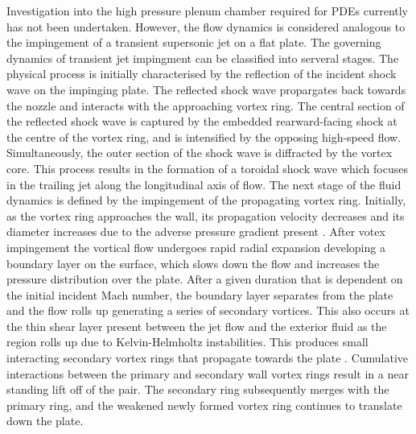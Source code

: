 Investigation into the high pressure plenum chamber required for PDEs currently has not been undertaken. However, the flow dynamics is considered analogous to the impingement of a transient supersonic jet on a flat plate. The governing dynamics of transient jet impingment can be classified into serveral stages. The physical process is initially characterised by the reflection of the incident shock wave on the impinging plate. The reflected shock wave propargates back towards the nozzle and interacts with the approaching vortex ring. The central section of the reflected shock wave is captured by the embedded rearward-facing shock at the centre of the vortex ring, and is intensified by the opposing high-speed flow. Simultaneously, the outer section of the shock wave is diffracted by the vortex core. This process results in the formation of a toroidal shock wave which focuses in the trailing jet along the longitudinal axis of flow. The next stage of the fluid dynamics is defined by the impingement of the propagating vortex ring. Initially, as the vortex ring approaches the wall, its propagation velocity decreases and its diameter increases due to the adverse pressure gradient present \cite{szumowski2000starting}. After votex impingement the vortical flow undergoes rapid radial expansion developing a boundary layer on the surface, which slows down the flow and increases the pressure distribution over the plate. After a given duration that is dependent on the initial incident Mach number, the boundary layer separates from the plate and the flow rolls up generating a series of secondary vortices. This also occurs at the thin shear layer present between the jet flow and the exterior fluid as the region rolls up due to Kelvin-Helmholtz instabilities. This produces small interacting secondary vortex rings that propagate towards the plate \cite{minota1997shock}. Cumulative interactions between the primary and secondary wall vortex rings result in a near standing lift off of the pair. The secondary ring subsequently merges with the primary ring, and the weakened newly formed vortex ring continues to translate down the plate. %

